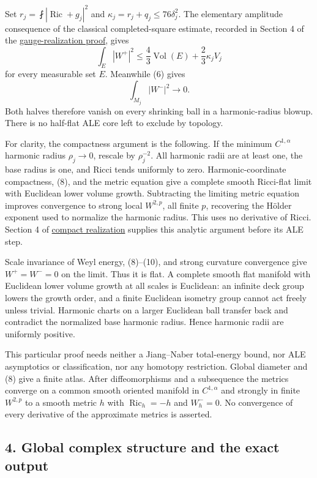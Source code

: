 \documentclass[
  11pt,
]{article}
\begin{document}
Set \(r_j=\fint|\operatorname{Ric}+g_j|^2\) and
\(\kappa_j=r_j+q_j\le76\delta_j^2\). The elementary amplitude
consequence of the classical completed-square estimate, recorded in
Section 4 of the
\href{20260923_gauge_saturation_ke.md}{gauge-realization proof}, gives
\[
 \int_E|W^+|^2\le\frac43\operatorname{Vol}(E)
                          +\frac23\kappa_jV_j            \tag{9}
\] for every measurable set \(E\). Meanwhile (6) gives \[
                  \int_{M_j}|W^-|^2\to0.                \tag{10}
\] Both halves therefore vanish on every shrinking ball in a
harmonic-radius blowup. There is no half-flat ALE core left to exclude
by topology.

For clarity, the compactness argument is the following. If the minimum
\(C^{1,\alpha}\) harmonic radius \(\rho_j\to0\), rescale by
\(\rho_j^{-2}\). All harmonic radii are at least one, the base radius is
one, and Ricci tends uniformly to zero. Harmonic-coordinate compactness,
(8), and the metric equation give a complete smooth Ricci-flat limit
with Euclidean lower volume growth. Subtracting the limiting metric
equation improves convergence to strong local \(W^{2,p}\), all finite
\(p\), recovering the Hölder exponent used to normalize the harmonic
radius. This uses no derivative of Ricci. Section 4 of
\href{20260923_compact_realization.md}{compact realization} supplies
this analytic argument before its ALE step.

Scale invariance of Weyl energy, (8)--(10), and strong curvature
convergence give \(W^+=W^-=0\) on the limit. Thus it is flat. A complete
smooth flat manifold with Euclidean lower volume growth at all scales is
Euclidean: an infinite deck group lowers the growth order, and a finite
Euclidean isometry group cannot act freely unless trivial. Harmonic
charts on a larger Euclidean ball transfer back and contradict the
normalized base harmonic radius. Hence harmonic radii are uniformly
positive.

This particular proof needs neither a Jiang--Naber total-energy bound,
nor ALE asymptotics or classification, nor any homotopy restriction.
Global diameter and (8) give a finite atlas. After diffeomorphisms and a
subsequence the metrics converge on a common smooth oriented manifold in
\(C^{1,\alpha}\) and strongly in finite \(W^{2,p}\) to a smooth metric
\(h\) with \(\operatorname{Ric}_h=-h\) and \(W_h^-=0\). No convergence
of every derivative of the approximate metrics is asserted.

\hypertarget{global-complex-structure-and-the-exact-output}{%
\subsection{4. Global complex structure and the exact
output}\label{global-complex-structure-and-the-exact-output}}
\end{document}

